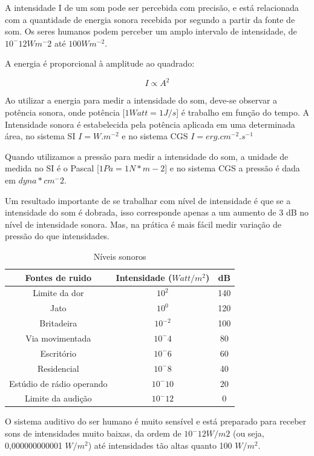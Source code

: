 \documentclass[
	article,			%
	11pt,				%
	oneside,			%
	a4paper,			%
	english,			%
	brazil,				%
	sumario=tradicional
	]{abntex2}
\begin{document}
A intensidade I de um som pode ser percebida com precisão, e está relacionada com a quantidade de energia sonora recebida por segundo a partir da fonte de som. Os seres humanos podem perceber um amplo intervalo de intensidade, de $10^-12 Wm^-2$ até $100 Wm^{-2}$.

\begin{center}
    A energia é proporcional à amplitude ao quadrado:
\end{center}
$$I \propto A^2$$

Ao utilizar a energia para medir a intensidade do som, deve-se observar a potência sonora, onde potência [$1 Watt=1 J/s$] é trabalho em função do tempo. A Intensidade sonora é estabelecida pela potência aplicada em uma determinada área, no sistema SI $I=W.m^{-2}$ e no sistema CGS $I= erg.cm^{-2}.s^{-1}$

Quando utilizamos a pressão para medir a intensidade do som, a unidade de medida no SI é o Pascal [$1 Pa= 1 N*m-2$] e no sistema CGS a pressão é dada em $dyna*cm^-2$.

Um resultado importante de se trabalhar com nível de intensidade é que se a intensidade do som é dobrada, isso corresponde apenas a um aumento de 3 dB no nível de intensidade sonora. Mas, na prática é mais fácil medir variação de pressão do que intensidades.

\begin{table}[hb]
\centering
    \begin{tabular}{c  c  c}
Fontes de ruido & Intensidade ($Watt/m^2$) & dB\\ 
\hline
Limite da dor & $10^2$ & 140\\
\hline
Jato & $10^0$ & 120\\
\hline
Britadeira & $10^{-2}$ & 100\\
\hline
Via movimentada & $10^-4$ & 80\\
\hline
Escritório & $10^-6$ & 60\\
\hline
Residencial & $10^-8$ & 40\\
\hline
Estúdio de rádio operando & $10^-10$ & 20\\
\hline
Limite da audição & $10^-12$ & 0\\
\hline
    \end{tabular}
    \caption{Níveis sonoros}
\end{table}

O sistema auditivo do ser humano é muito sensível
e está preparado para receber sons de intensidades
muito baixas, da ordem de $10^-12 W/m2$ (ou seja,
0,000000000001 $W/m^2$) até intensidades tão altas
quanto 100 $W/m^2$.
\end{document}
